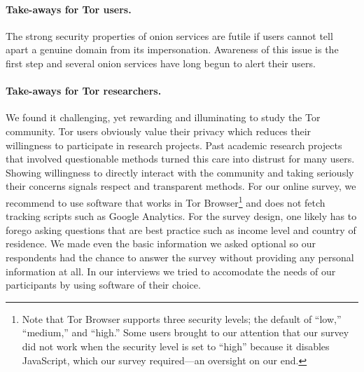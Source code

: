 \paragraph{Take-aways for Tor users.}

The strong security properties of onion services are futile if users cannot tell
apart a genuine domain from its impersonation.  Awareness of this issue is the
first step and several onion services have long begun to alert their users.

\paragraph{Take-aways for Tor researchers.}

We found it challenging, yet rewarding and illuminating to study the Tor
community.  Tor users obviously value their privacy which reduces their
willingness to participate in research projects.  Past academic research
projects that involved questionable methods turned this care into distrust for
many users.  Showing willingness to directly interact with the community and
taking seriously their concerns signals respect and transparent methods.  For
our online survey, we recommend to use software that works in Tor
Browser\footnote{Note that Tor Browser supports three security levels; the
default of ``low,'' ``medium,'' and ``high.''  Some users brought to our
attention that our survey did not work when the security level is set to
``high'' because it disables JavaScript, which our survey required---an
oversight on our end.} and does not fetch tracking scripts such as Google
Analytics.  For the survey design, one likely has to forego asking questions
that are best practice such as income level and country of residence.  We made
even the basic information we asked optional so our respondents had the chance
to answer the survey without providing any personal information at all.  In our
interviews we tried to accomodate the needs of our participants by using
software of their choice.
